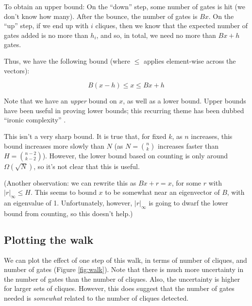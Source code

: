 \documentclass[12pt]{article}
\theoremstyle{definition}
\begin{document}
To obtain an upper bound: On the ``down'' step, some number of gates is hit (we don't know how many).
After the bounce, the number of gates is $Bx$.
On the ``up'' step,
if we end up with $i$ cliques, then we know that the expected number of gates added is no more than $h_i$,
and so, in total, we need no more than $Bx+h$ gates.

Thus, we have the following bound (where $\le$ applies element-wise across the vectors):

\begin{equation}
\label{eq:stepBound}
B(x - h) \le x \le Bx + h
\end{equation}

Note that we have an {\em upper} bound on $x$, as well
as a lower bound. Upper bounds have been useful in proving lower bounds;
this recurring theme has been dubbed ``ironic complexity''
\cite{aaronson_pnp}.

This isn't a very sharp bound.
It is true that, for fixed $k$, as $n$ increases, this bound increases more slowly than $N$ (as $N = {n \choose k}$ increases faster than $H = {{n-2} \choose {k-2}}$). However, the lower bound based on
counting is only around $\Omega(\sqrt{N})$, so it's not clear that this is useful.

(Another observation: we can rewrite this as $Bx + r = x$,
for some $r$ with $|r|_\infty \le H$. This seems to bound $x$ to be somewhat near
an eigenvector of $B$, with an eigenvalue of 1. Unfortunately, however,
$|r|_\infty$ is going to dwarf the lower bound
from counting, so this doesn't help.)

\subsection{Plotting the walk}

We can plot the effect of one step of this walk, in terms of number of cliques, and number of gates (Figure \ref{fig:walk}).
Note that there is much more uncertainty in the number of gates than the number of cliques. Also, the
uncertainty is higher
for larger sets of cliques.  However, this does suggest that the
number of gates needed is {\em somewhat} related to the number of cliques detected.
\end{document}
